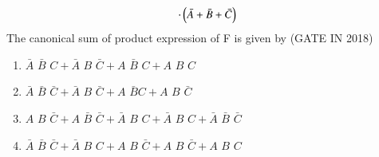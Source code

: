 \begin{enumerate}[label=\arabic*.,ref=\theenumi]
\begin{multline}
	\\
	\cdot\left(\bar{A} + \bar{B} + \bar{C}\right)
\end{multline}
The canonical sum of product expression of F is  given by
\hfill (GATE IN 2018)
  \begin{enumerate}[label=(\Alph*)]                               
	  \item $\bar{A}\hspace{4pt}\bar{B}\hspace{4pt}C+ \bar{A}\hspace{4pt}B\hspace{4pt}\bar{C} + A\hspace{4pt}\bar{B}\hspace{4pt}C + A\hspace{4pt}B\hspace{4pt}C$
	  \item $\bar{A}\hspace{4pt}\bar{B}\hspace{4pt}\bar{C} + \bar{A}\hspace{4pt}B\hspace{4pt}\bar{C} + A\hspace{4pt}\bar{B} C + A\hspace{4pt}B\hspace{4pt}\bar{C}$
	  \item $A\hspace{4pt}B\hspace{4pt} \bar{C} + A\hspace{4pt}\bar{B}\hspace{4pt}\bar{C} + \bar{A}\hspace{4pt}B\hspace{4pt}C + \bar{A}\hspace{4pt}B\hspace{4pt}C + \bar{A}\hspace{4pt}\bar{B}\hspace{4pt}\bar{C}$
	  \item $\bar{A}\hspace{4pt}\bar{B}\hspace{4pt}\bar{C} + \bar{A}\hspace{4pt}B\hspace{4pt}C +A\hspace{4pt}B\hspace{4pt}\bar{C} + A\hspace{4pt}B\hspace{4pt}\bar{C}+ A\hspace{4pt}B\hspace{4pt}C$
\end{enumerate}



\end{enumerate}

